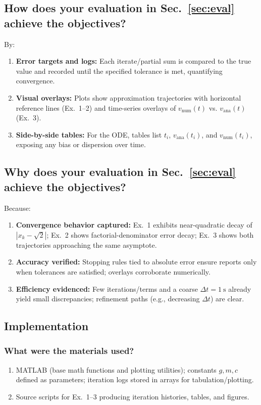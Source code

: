 \subsection{How does your evaluation in Sec.~\ref{sec:eval} achieve the objectives?}
By:
\begin{enumerate}
  \item \textbf{Error targets and logs:} Each iterate/partial sum is compared to the true value and
  recorded until the specified tolerance is met, quantifying convergence.
  \item \textbf{Visual overlays:} Plots show approximation trajectories with horizontal reference
  lines (Ex.~1–2) and time-series overlays of \(v_{\mathrm{num}}(t)\) vs. \(v_{\mathrm{ana}}(t)\) (Ex.~3).
  \item \textbf{Side-by-side tables:} For the ODE, tables list \(t_i\), \(v_{\mathrm{ana}}(t_i)\),
  and \(v_{\mathrm{num}}(t_i)\), exposing any bias or dispersion over time.
\end{enumerate}
	
\subsection{Why does your evaluation in Sec.~\ref{sec:eval}  achieve the objectives?}
Because:
\begin{enumerate}
  \item \textbf{Convergence behavior captured:} Ex.~1 exhibits near-quadratic decay of
  \(|x_k-\sqrt{2}|\); Ex.~2 shows factorial-denominator error decay; Ex.~3 shows both trajectories
  approaching the same asymptote.
  \item \textbf{Accuracy verified:} Stopping rules tied to absolute error ensure reports only when
  tolerances are satisfied; overlays corroborate numerically.
  \item \textbf{Efficiency evidenced:} Few iterations/terms and a coarse \(\Delta t=1~\mathrm{s}\)
  already yield small discrepancies; refinement paths (e.g., decreasing \(\Delta t\)) are clear.
\end{enumerate}



\subsection{Implementation}
\label{sec:implem}

\subsubsection{What were the materials used?}
\begin{enumerate}
  \item MATLAB (base math functions and plotting utilities); constants \(g, m, c\) defined as
  parameters; iteration logs stored in arrays for tabulation/plotting.
  \item Source scripts for Ex.~1–3 producing iteration histories, tables, and figures.
\end{enumerate}


